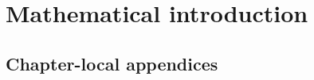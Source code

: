 \documentclass[12pt,a4paper,oneside]{report}
\numberwithin{equation}{section}
\numberwithin{figure}{chapter}
\numberwithin{table}{chapter}
\theoremstyle{plain}
\theoremstyle{definition}
\theoremstyle{remark}
\begin{document}
\tableofcontents
\clearpage

\setcounter{chapter}{1}
\chapter{Mathematical introduction}
\label{ch:mathematical-introduction}









\clearpage
\section*{Chapter-local appendices}
\begin{subappendices}



\end{subappendices}

\FloatBarrier
\clearpage
\begingroup
\small


\endgroup
\end{document}

